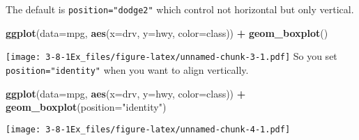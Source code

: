 \documentclass[]{article}
\newenvironment{Shaded}{\begin{snugshade}}{\end{snugshade}}
\newcommand{\DataTypeTok}[1]{\textcolor[rgb]{0.13,0.29,0.53}{#1}}
\newcommand{\KeywordTok}[1]{\textcolor[rgb]{0.13,0.29,0.53}{\textbf{#1}}}
\newcommand{\NormalTok}[1]{#1}
\newcommand{\OperatorTok}[1]{\textcolor[rgb]{0.81,0.36,0.00}{\textbf{#1}}}
\newcommand{\StringTok}[1]{\textcolor[rgb]{0.31,0.60,0.02}{#1}}
\begin{document}
The default is \texttt{position="dodge2"} which control not horizontal
but only vertical.

\begin{Shaded}
\begin{Highlighting}[]
\KeywordTok{ggplot}\NormalTok{(}\DataTypeTok{data=}\NormalTok{mpg, }\KeywordTok{aes}\NormalTok{(}\DataTypeTok{x=}\NormalTok{drv, }\DataTypeTok{y=}\NormalTok{hwy, }\DataTypeTok{color=}\NormalTok{class)) }\OperatorTok{+}
\StringTok{    }\KeywordTok{geom_boxplot}\NormalTok{()}
\end{Highlighting}
\end{Shaded}

\texttt{[image: 3-8-1Ex\_files/figure-latex/unnamed-chunk-3-1.pdf]} So
you set \texttt{position="identity"} when you want to align vertically.

\begin{Shaded}
\begin{Highlighting}[]
\KeywordTok{ggplot}\NormalTok{(}\DataTypeTok{data=}\NormalTok{mpg, }\KeywordTok{aes}\NormalTok{(}\DataTypeTok{x=}\NormalTok{drv, }\DataTypeTok{y=}\NormalTok{hwy, }\DataTypeTok{color=}\NormalTok{class)) }\OperatorTok{+}
\StringTok{    }\KeywordTok{geom_boxplot}\NormalTok{(}\DataTypeTok{position=}\StringTok{"identity"}\NormalTok{)}
\end{Highlighting}
\end{Shaded}

\texttt{[image: 3-8-1Ex\_files/figure-latex/unnamed-chunk-4-1.pdf]}
\end{document}

